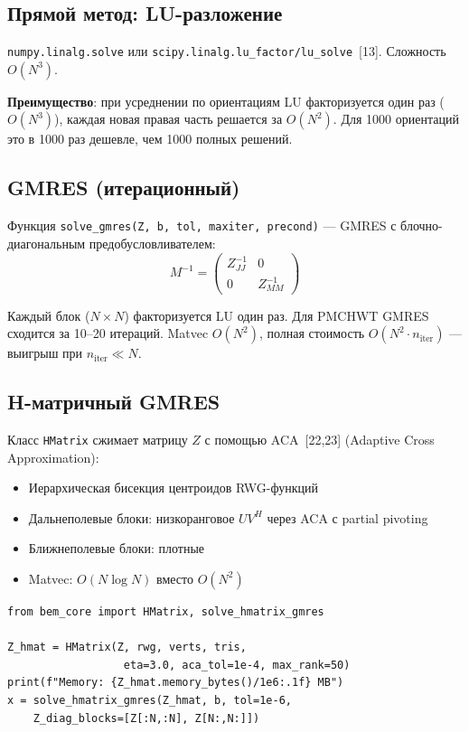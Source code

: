 \documentclass[12pt,a4paper]{article}
\begin{document}
\subsection{Прямой метод: LU-разложение}

\texttt{numpy.linalg.solve} или \texttt{scipy.linalg.lu\_factor/lu\_solve}~[13]. Сложность $O(N^3)$.

\textbf{Преимущество}: при усреднении по ориентациям LU факторизуется один раз ($O(N^3)$), каждая новая правая часть решается за $O(N^2)$. Для 1000 ориентаций это в 1000 раз дешевле, чем 1000 полных решений.

\subsection{GMRES (итерационный)}

Функция \texttt{solve\_gmres(Z, b, tol, maxiter, precond)} --- GMRES с блочно-диагональным предобусловливателем:
\begin{equation}
  M^{-1} = \begin{pmatrix} Z_{JJ}^{-1} & 0 \\ 0 & Z_{MM}^{-1} \end{pmatrix}
\end{equation}

Каждый блок ($N \times N$) факторизуется LU один раз. Для PMCHWT GMRES сходится за 10--20 итераций. Matvec $O(N^2)$, полная стоимость $O(N^2 \cdot n_{\mathrm{iter}})$ --- выигрыш при $n_{\mathrm{iter}} \ll N$.

\subsection{H-матричный GMRES}

Класс \texttt{HMatrix} сжимает матрицу $Z$ с помощью ACA~[22,23] (Adaptive Cross Approximation):
\begin{itemize}
  \item Иерархическая бисекция центроидов RWG-функций
  \item Дальнеполевые блоки: низкоранговое $U V^H$ через ACA с partial pivoting
  \item Ближнеполевые блоки: плотные
  \item Matvec: $O(N \log N)$ вместо $O(N^2)$
\end{itemize}

\begin{lstlisting}
from bem_core import HMatrix, solve_hmatrix_gmres

Z_hmat = HMatrix(Z, rwg, verts, tris,
                  eta=3.0, aca_tol=1e-4, max_rank=50)
print(f"Memory: {Z_hmat.memory_bytes()/1e6:.1f} MB")
x = solve_hmatrix_gmres(Z_hmat, b, tol=1e-6,
    Z_diag_blocks=[Z[:N,:N], Z[N:,N:]])
\end{lstlisting}
\end{document}
